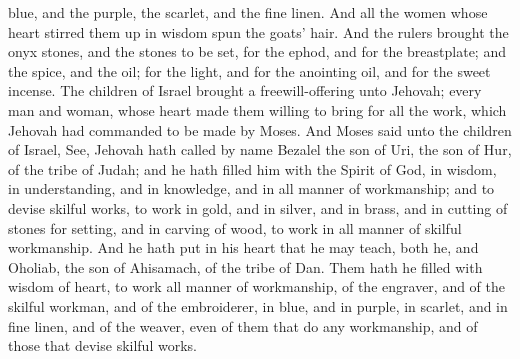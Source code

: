 blue, and the purple, the scarlet, and the fine linen. And all the women whose heart stirred them up in wisdom spun the goats’ hair. And the rulers brought the onyx stones, and the stones to be set, for the ephod, and for the breastplate; and the spice, and the oil; for the light, and for the anointing oil, and for the sweet incense. The children of Israel brought a freewill-offering unto Jehovah; every man and woman, whose heart made them willing to bring for all the work, which Jehovah had commanded to be made by Moses.  And Moses said unto the children of Israel, See, Jehovah hath called by name Bezalel the son of Uri, the son of Hur, of the tribe of Judah; and he hath filled him with the Spirit of God, in wisdom, in understanding, and in knowledge, and in all manner of workmanship; and to devise skilful works, to work in gold, and in silver, and in brass, and in cutting of stones for setting, and in carving of wood, to work in all manner of skilful workmanship. And he hath put in his heart that he may teach, both he, and Oholiab, the son of Ahisamach, of the tribe of Dan. Them hath he filled with wisdom of heart, to work all manner of workmanship, of the engraver, and of the skilful workman, and of the embroiderer, in blue, and in purple, in scarlet, and in fine linen, and of the weaver, even of them that do any workmanship, and of those that devise skilful works. 

